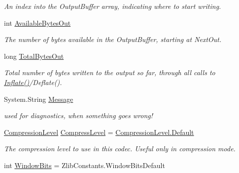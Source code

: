 \begin{DoxyCompactItemize}
\begin{DoxyCompactList}\small\item\em An index into the Output\+Buffer array, indicating where to start writing. \end{DoxyCompactList}\item 
int \mbox{\hyperlink{class_super_tiled2_unity_1_1_ionic_1_1_zlib_1_1_zlib_codec_a50fd2ef7680382786fe5c35b46a48207}{Available\+Bytes\+Out}}
\begin{DoxyCompactList}\small\item\em The number of bytes available in the Output\+Buffer, starting at Next\+Out. \end{DoxyCompactList}\item 
long \mbox{\hyperlink{class_super_tiled2_unity_1_1_ionic_1_1_zlib_1_1_zlib_codec_a8f8527e39db5c3b855dd79f2b02de8d0}{Total\+Bytes\+Out}}
\begin{DoxyCompactList}\small\item\em Total number of bytes written to the output so far, through all calls to \mbox{\hyperlink{class_super_tiled2_unity_1_1_ionic_1_1_zlib_1_1_zlib_codec_a9586e5a25c06331824638439938ac8c8}{Inflate()}}/\+Deflate(). \end{DoxyCompactList}\item 
System.\+String \mbox{\hyperlink{class_super_tiled2_unity_1_1_ionic_1_1_zlib_1_1_zlib_codec_af3f680d470f3792d3918273bc48dc4d7}{Message}}
\begin{DoxyCompactList}\small\item\em used for diagnostics, when something goes wrong! \end{DoxyCompactList}\item 
\mbox{\hyperlink{namespace_super_tiled2_unity_1_1_ionic_1_1_zlib_a20f6771804996c363f454ad9765cd7db}{Compression\+Level}} \mbox{\hyperlink{class_super_tiled2_unity_1_1_ionic_1_1_zlib_1_1_zlib_codec_a47b2e1b70011088f4a05dbbe16d6cb77}{Compress\+Level}} = \mbox{\hyperlink{namespace_super_tiled2_unity_1_1_ionic_1_1_zlib_a20f6771804996c363f454ad9765cd7dba7a1920d61156abc05a60135aefe8bc67}{Compression\+Level.\+Default}}
\begin{DoxyCompactList}\small\item\em The compression level to use in this codec. Useful only in compression mode. \end{DoxyCompactList}\item 
int \mbox{\hyperlink{class_super_tiled2_unity_1_1_ionic_1_1_zlib_1_1_zlib_codec_a054b7ff1da2e1bac82b771808706398c}{Window\+Bits}} = Zlib\+Constants.\+Window\+Bits\+Default

\end{DoxyCompactItemize}
